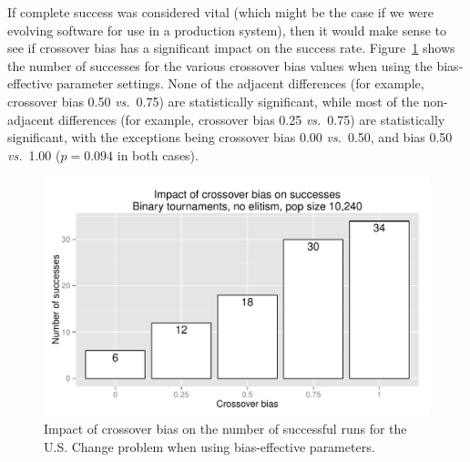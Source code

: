 \documentclass{sig-alternate}
\begin{document}
%
%
%
%

If complete success was considered vital (which might be the case if we were evolving software for use in a production
system), then it would make sense to see if crossover bias has a significant impact on the success rate.
Figure~\ref{fig:USChange_Successes_strong} shows the number of successes for the various crossover bias values when
using the bias-effective parameter settings. None of the adjacent differences (for example, crossover bias 0.50
\emph{vs.}\ 0.75) are statistically significant, while most of the non-adjacent differences (for example, crossover bias
0.25 \emph{vs.}\ 0.75) are statistically significant, with the exceptions being crossover bias 0.00 \emph{vs.}\ 0.50, and
bias 0.50 \emph{vs.}\ 1.00 ($p=0.094$ in both cases).

\begin{figure}
\centering
\includegraphics[width=0.45 \textwidth]{Plots/US_change_successes_strong.pdf}
\caption{Impact of crossover bias on the number of successful runs for the U.S. Change problem when using
bias-effective parameters.}
\label{fig:USChange_Successes_strong}
\end{figure}

%
%
%
%

\end{document}
